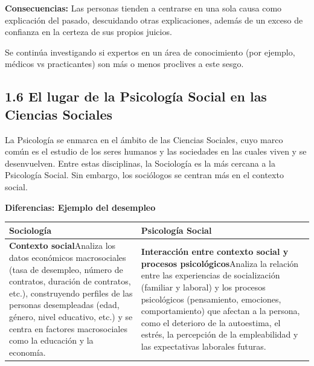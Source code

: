 \documentclass[
]{website}
\begin{document}
\textbf{Consecuencias:} Las personas tienden a centrarse en una sola causa como explicación del pasado, descuidando otras explicaciones, además de un exceso de confianza en la certeza de sus propios juicios.

Se continúa investigando si expertos en un área de conocimiento (por ejemplo, médicos vs practicantes) son más o menos proclives a este sesgo.

\subsection*{1.6 El lugar de la Psicología Social en las Ciencias Sociales}\label{subtema1_6}

La Psicología se enmarca en el ámbito de las Ciencias Sociales, cuyo marco común es el estudio de los seres humanos y las sociedades en las cuales viven y se desenvuelven. Entre estas disciplinas, la Sociología es la más cercana a la Psicología Social. Sin embargo, los sociólogos se centran más en el contexto social.

\textbf{Diferencias: Ejemplo del desempleo}

\begin{longtable}[]{@{}
  >{\raggedright\arraybackslash}p{}
  >{\raggedright\arraybackslash}p{}@{}}
\toprule\noalign{}
\begin{minipage}[b]{\linewidth}\raggedright
Sociología
\end{minipage} & \begin{minipage}[b]{\linewidth}\raggedright
Psicología Social
\end{minipage} \\
\midrule\noalign{}
\endhead
\bottomrule\noalign{}
\endlastfoot
\textbf{Contexto social}Analiza los datos económicos macrosociales (tasa de desempleo, número de contratos, duración de contratos, etc.), construyendo perfiles de las personas desempleadas (edad, género, nivel educativo, etc.) y se centra en factores macrosociales como la educación y la economía. & \textbf{Interacción entre contexto social y procesos psicológicos}Analiza la relación entre las experiencias de socialización (familiar y laboral) y los procesos psicológicos (pensamiento, emociones, comportamiento) que afectan a la persona, como el deterioro de la autoestima, el estrés, la percepción de la empleabilidad y las expectativas laborales futuras. \\
\end{longtable}
\end{document}
